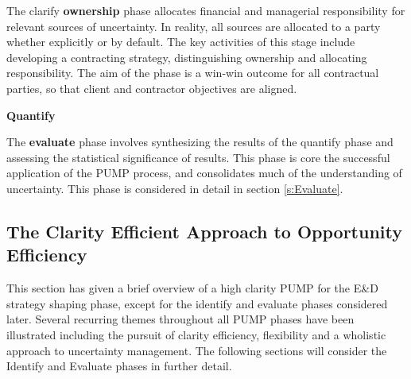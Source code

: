 The clarify \textbf{ownership} phase allocates financial and managerial responsibility for relevant sources of uncertainty.
In reality, all sources are allocated to a party whether explicitly or by default.
The key activities of this stage include developing a contracting strategy, distinguishing ownership and allocating responsibility.
The aim of the phase is a win-win outcome for all contractual parties, so that client and contractor objectives are aligned.

\textbf{Quantify}

The \textbf{evaluate} phase involves synthesizing the results of the quantify phase and assessing the statistical significance of results.
This phase is core the successful application of the PUMP process, and consolidates much of the understanding of uncertainty.
This phase is considered in detail in section \ref{s:Evaluate}.


\subsection{The Clarity Efficient Approach to Opportunity Efficiency}
This section has given a brief overview of a high clarity PUMP for the E\&D strategy shaping phase, except for the identify and evaluate phases considered later.
Several recurring themes throughout all PUMP phases have been illustrated including the pursuit of clarity efficiency, flexibility and a wholistic approach to uncertainty management.
The following sections will consider the Identify and Evaluate phases in further detail.


